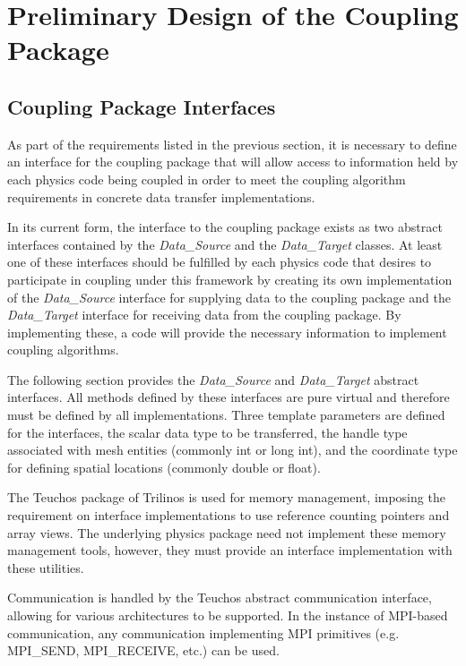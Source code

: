 \documentclass[letterpaper]{article}
\begin{document}
\section{Preliminary Design of the Coupling Package}

\subsection{Coupling Package Interfaces}
As part of the requirements listed in the previous section, it is
necessary to define an interface for the coupling package that will
allow access to information held by each physics code being coupled in
order to meet the coupling algorithm requirements in concrete data
transfer implementations.

In its current form, the interface to the coupling package exists as
two abstract interfaces contained by the {\sl Data\_Source} and the
{\sl Data\_Target} classes. At least one of these interfaces should be
fulfilled by each physics code that desires to participate in coupling
under this framework by creating its own implementation of the {\sl
  Data\_Source} interface for supplying data to the coupling package
and the {\sl Data\_Target} interface for receiving data from the
coupling package. By implementing these, a code will provide the
necessary information to implement coupling algorithms. 

The following section provides the {\sl Data\_Source} and {\sl
  Data\_Target} abstract interfaces. All methods defined by these
interfaces are pure virtual and therefore must be defined by all
implementations. Three template parameters are defined for the
interfaces, the scalar data type to be transferred, the handle type
associated with mesh entities (commonly int or long int), and the
coordinate type for defining spatial locations (commonly double or float).

The Teuchos package of Trilinos is used for memory management,
imposing the requirement on interface implementations to use reference
counting pointers and array views. The underlying physics package need
not implement these memory management tools, however, they must
provide an interface implementation with these utilities.

Communication is handled by the Teuchos abstract communication
interface, allowing for various architectures to be supported. In the
instance of MPI-based communication, any communication implementing
MPI primitives (e.g. MPI\_SEND, MPI\_RECEIVE, etc.) can be used.
\end{document}
